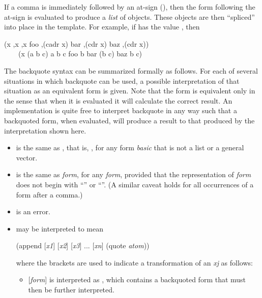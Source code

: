 \begin{flushdesc}
If a comma is immediately followed by an at-sign (\cd{{\Xatsign}}), then the
form following the at-sign is evaluated to produce a {\it list} of objects.
These objects are then ``spliced'' into place in the template.  For
example, if  has the value , then
\begin{lisp}
{\Xbq}(x ,x ,{\Xatsign}x foo ,(cadr x) bar ,(cdr x) baz ,{\Xatsign}(cdr x)) \\
~~~\EV\ (x (a b c) a b c foo b bar (b c) baz b c)
\end{lisp}

The backquote syntax can be summarized formally as follows.
For each of several situations in which backquote can be used,
a possible interpretation of that situation as an equivalent form
is given.  Note that the form is equivalent only
in the sense that when it is evaluated it will calculate the
correct result.
An implementation is quite free to interpret backquote in any way
such that a backquoted form, when evaluated, will produce a result
 to that produced by the interpretation shown here.
\begin{itemize}
\item
{} is the same as ,
that is, , for any form {\it basic} that is not a
list or a general vector.

\item
{} is the same as {\it form}, for any {\it form}, provided
that the representation of {\it form} does not begin with ``\cd{{\Xatsign}}''
or ``''.  (A similar caveat holds for all occurrences of a form
after a comma.)

\item
{} is an error.

\item
{} may be interpreted to mean
\begin{lisp}
(append {\rm [}{\it x1}{\rm ]} {\rm [}{\it x2}{\rm ]}
    {\rm [}{\it x3}{\rm ]} ... {\rm [}{\it xn}{\rm ]} (quote {\it atom}))
\end{lisp}
where the brackets are used to indicate
a transformation of an {\it xj} as follows:
\begin{itemize}
\item
{\rm [}{\it form}{\rm ]} is interpreted as , which
contains a backquoted form that must then be further interpreted.


\end{itemize}
\end{itemize}
\end{flushdesc}
